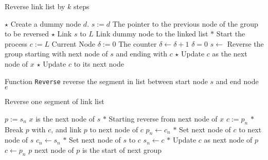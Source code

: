 \setcounter{algorithm}{0}
\begin{algorithm}[H]
\caption{Reverse link list by $k$ steps}
\begin{algorithmic}[1]
\State $\star$ Create a dummy node $d$.
\State $s:=d$ \Comment The pointer to the previous node of the group to be reversed
\State $\star$ Link $s$ to $L$ \Comment Link dummy node to the linked list
\State $\ast$ Start the process
\State $c:=L$ \Comment Current Node
\State $\delta:=0$ \Comment The counter
\State $\delta\gets\delta + 1$
\State $\delta=0$
\State $s\gets$ \Comment Reverse the group starting with next node of $s$ and ending with $c$
\State $\star$ Update $c$ as the next node of $x$
\Else
\State $\star$ Update $c$ to its next node
\EndIf
\EndWhile
\EndProcedure
\end{algorithmic}
\end{algorithm}

Function \texttt{Reverse} reverse the segment in list between start node $s$ and end node $e$

\begin{algorithm}[H]
\caption{Reverse one segment of link list }
\begin{algorithmic}[1]
\State $p := s_n$ \Comment $x$ is the next node of $s$
\State $\ast$ Starting reverse from next node of $x$
\State $c := p_n$ 
\State $\ast$ Break $p$ with $c$, and link $p$ to next node of $c$
\State $p_n \gets c_n $
\State $\ast$ Set next node of $c$ to next node of $s$
\State $c_n \gets s_n $ 
\State $\ast$ Set next node of $s$ to $c$
\State $s_n \gets c$ 
\State $\ast$ Update $c$ as next node of $p$
\State $c\gets p_n$
\EndWhile
\State \Return $p$ \Comment next node of $p$ is the start of next group
\EndFunction
\end{algorithmic}
\end{algorithm}


